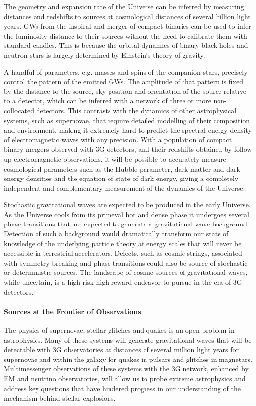 \documentclass[twocolumn,aps,prd,nofootinbib,superscriptaddress,10pt,notitlepage,preprintnumbers] {revtex4-1}
\begin{document}
The geometry and expansion rate of the Universe can be inferred by measuring distances and redshifts to sources at cosmological distances of several billion light years.  GWs from the inspiral and merger of compact binaries can be used to infer the luminosity distance to their sources without the need to calibrate them with standard candles. This is because the orbital dynamics of binary black holes and neutron stars is largely determined by Einstein's theory of gravity.

A handful of parameters, e.g. masses and spins of the companion stars, precisely control the pattern of the emitted GWs. The amplitude of that pattern is fixed by the distance to the source, sky position and orientation of the source relative to a detector, which can be inferred with a network of three or more non-collocated detectors.  This contrasts with the dynamics of other astrophysical systems, such as supernovae, that require detailed modelling of their composition and environment, making it extremely hard to predict the spectral energy density of electromagnetic waves with any precision.  With a population of compact binary mergers observed with 3G detectors, and their redshifts obtained by follow up electromagnetic observations, it will be possible to accurately measure cosmological parameters such as the Hubble parameter, dark matter and dark energy densities and the equation of state of dark energy, giving a completely independent and complementary measurement of the dynamics of the Universe.

Stochastic gravitational waves are expected to be produced in the early Universe. As the Universe cools from its primeval hot and dense phase it undergoes several phase transitions that are expected to generate a gravitational-wave background. Detection of such a background would dramatically transform our state of knowledge of the underlying particle theory at energy scales that will never be accessible in terrestrial accelerators. Defects, such as cosmic strings, associated with symmetry breaking and phase transitions could also be source of stochastic or deterministic sources. The landscape of cosmic sources of gravitational waves, while uncertain, is a high-risk high-reward endeavor to pursue in the era of 3G detectors.

\noindent \paragraph{Sources at the Frontier of Observations}
The physics of supernovae, stellar glitches and quakes is an open problem in astrophysics. Many of these systems will generate gravitational waves that will be detectable with 3G observatories at distances of several million light years for supernovae and within the galaxy for quakes in pulsars and glitches in magnetars.  Multimessenger observations of these systems with the 3G network, enhanced by EM and neutrino observatories, will allow us to probe extreme astrophysics and address key questions that have hindered progress in our understanding of the mechanism behind stellar explosions.
\end{document}
